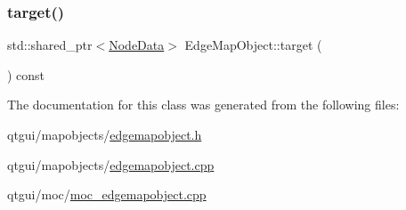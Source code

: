 \subsubsection{\texorpdfstring{target()}{target()}}
{\footnotesize\ttfamily std\+::shared\+\_\+ptr$<$\mbox{\hyperlink{class_node_data}{Node\+Data}}$>$ Edge\+Map\+Object\+::target (\begin{DoxyParamCaption}{ }\end{DoxyParamCaption}) const\hspace{0.3cm}{\ttfamily [inline]}}



The documentation for this class was generated from the following files\+:\begin{DoxyCompactItemize}
\item 
qtgui/mapobjects/\mbox{\hyperlink{edgemapobject_8h}{edgemapobject.\+h}}\item 
qtgui/mapobjects/\mbox{\hyperlink{edgemapobject_8cpp}{edgemapobject.\+cpp}}\item 
qtgui/moc/\mbox{\hyperlink{moc__edgemapobject_8cpp}{moc\+\_\+edgemapobject.\+cpp}}\end{DoxyCompactItemize}
